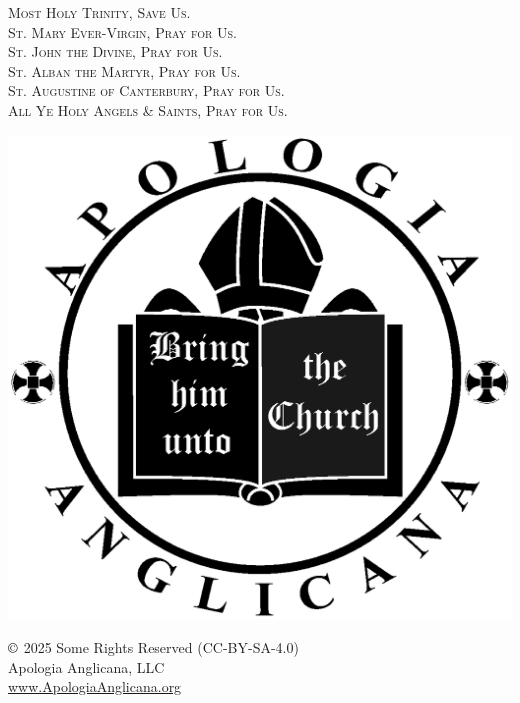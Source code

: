  \fancyhead[RE,LO]{}
   \begin{center}
   	\textsc{
   	Most Holy Trinity, Save Us.\\
   	\small{
   	St. Mary Ever-Virgin, Pray for Us.\\
   	St. John the Divine, Pray for Us.\\
   	St. Alban the Martyr, Pray for Us.\\
   	St. Augustine of Canterbury, Pray for Us.\\
   	All Ye Holy Angels \& Saints, Pray for Us.
   	}
   	}
   	\vfill
   	\par
   	\includegraphics[scale=.2]{logo.eps}
			\par
	$\copyright$ 2025 Some Rights Reserved (CC-BY-SA-4.0)\\
	Apologia Anglicana, LLC\\
	\url{www.ApologiaAnglicana.org}
   \end{center}